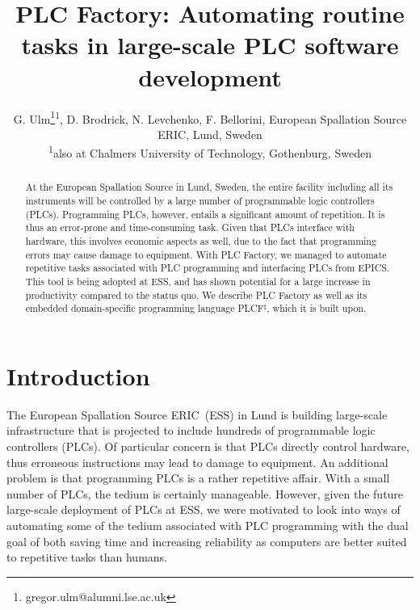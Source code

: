 \documentclass[a4paper,
              ]{jacow}
\begin{document}
\title{ PLC Factory: Automating routine tasks in large-scale PLC software development}

\author{G. Ulm\thanks{gregor.ulm@alumni.lse.ac.uk}\textsuperscript{1}, D. Brodrick, N. Levchenko, F. Bellorini, European Spallation Source ERIC, Lund, Sweden\\
		\textsuperscript{1}also at Chalmers University of Technology, Gothenburg, Sweden
		}
	
\maketitle



\begin{abstract}
At the European Spallation Source in Lund, Sweden, the entire facility including all its instruments will be controlled by a large number of programmable logic controllers (PLCs). Programming PLCs, however, entails a significant amount of repetition. It is thus an error-prone and time-consuming task. Given that PLCs interface with hardware, this involves economic aspects as well, due to the fact that programming errors may cause damage to equipment. With PLC Factory, we managed to automate repetitive tasks associated with PLC programming and interfacing PLCs from EPICS. This tool is being adopted at ESS, and has shown potential for a large increase in productivity compared to the status quo. We describe PLC Factory as well as its embedded domain-specific programming language PLCF$^\sharp$, which it is built upon.
\end{abstract}



\section{Introduction}
The European Spallation Source ERIC~(ESS) in Lund is building large-scale infrastructure that is projected to include hundreds of programmable logic controllers (PLCs). Of particular concern is that PLCs directly control hardware, thus erroneous instructions may lead to damage to equipment. An additional problem is that programming PLCs is a rather repetitive affair. With a small number of PLCs, the tedium is certainly manageable. However, given the future large-scale deployment of PLCs at ESS, we were motivated to look into ways of automating some of the tedium associated with PLC programming with the dual goal of both saving time and increasing reliability as computers are better suited to repetitive tasks than humans.
\end{document}
